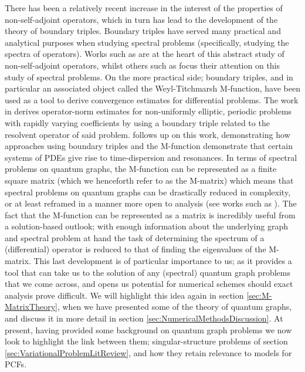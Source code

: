 There has been a relatively recent increase in the interest of the properties of non-self-adjoint operators, which in turn has lead to the development of the theory of boundary triples.
Boundary triples have served many practical and analytical purposes when studying spectral problems (specifically, studying the spectra of operators).
Works such as \cite{ryzhov2007functional} are at the heart of this abstract study of non-self-adjoint operators, whilst others such as \cite{ryzhov2009spectral} focus their attention on this study of spectral problems.
On the more practical side; boundary triples, and in particular an associated object called the Weyl-Titchmarsh M-function, have been used as a tool to derive convergence estimates for differential problems.
The work in \cite{cherednichenko2017norm} derives operator-norm estimates for non-uniformly elliptic, periodic problems with rapidly varying coefficients by using a boundary triple related to the resolvent operator of said problem.
\cite{cherednichenko2018effective} follows up on this work, demonstrating how approaches using boundary triples and the M-function demonstrate that certain systems of PDEs give rise to time-dispersion and resonances. 
In terms of spectral problems on quantum graphs, the M-function can be represented as a finite square matrix \cite{ershova2014isospectrality} (which we henceforth refer to as the M-matrix) which means that spectral problems on quantum graphs can be drastically reduced in complexity, or at least reframed in a manner more open to analysis (see works such as \cite{ershova2016isospectrality}).
The fact that the M-function can be represented as a matrix is incredibly useful from a solution-based outlook; with enough information about the underlying graph and spectral problem at hand the task of determining the spectrum of a (differential) operator is reduced to that of finding the eigenvalues of the M-matrix.
This last development is of particular importance to us; as it provides a tool that can take us to the solution of any (spectral) quantum graph problems that we come across, and opens us potential for numerical schemes should exact analysis prove difficult.
We will highlight this idea again in section \ref{sec:M-MatrixTheory}, when we have presented some of the theory of quantum graphs, and discuss it in more detail in section \ref{sec:NumericalMethodsDiscussion}.
At present, having provided some background on quantum graph problems we now look to highlight the link between them; singular-structure problems of section \ref{sec:VariationalProblemLitReview}, and how they retain relevance to models for PCFs. \newline

